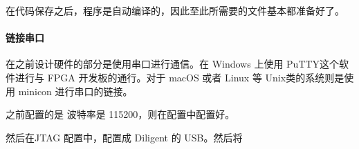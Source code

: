 \documentclass{ctexart}
\begin{document}
        在代码保存之后，程序是自动编译的，因此至此所需要的文件基本都准备好了。
        
        \paragraph{链接串口}
        
        在之前设计硬件的部分是使用串口进行通信。在 Windows 上使用
        PuTTY这个软件进行与 FPGA 开发板的通行。对于 macOS 或者 Linux
        等 Unix类的系统则是使用 minicon 进行串口的链接。
        
        之前配置的是 波特率是 115200，则在配置中配置好。
        
        然后在JTAG 配置中，配置成 Diligent 的 USB。然后将
        
        
\end{document}

